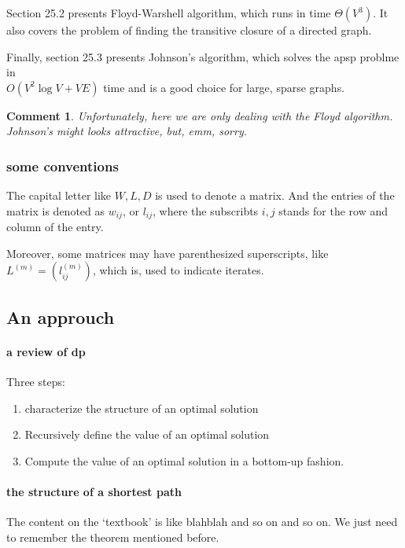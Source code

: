 \documentclass[a4paper, 10pt]{ctexart} %
\newtheorem{corollary}{Comment}
\begin{document}
Section 25.2 presents Floyd-Warshell algorithm, which
runs in time $\Theta \left( V^3\right)$. It also 
covers the problem of finding the 
transitive closure of a directed graph. 

Finally, section 25.3 presents Johnson's algorithm, which solves the 
apsp problme in \\ $O\left( V^{2} \log  V +VE\right)$ time and 
is a good choice for large, sparse graphs.
\begin{corollary}
Unfortunately, here we are only dealing with 
the Floyd algorithm. Johnson's might looks 
attractive, but, emm, sorry.
\end{corollary}
\subsubsection{some conventions}
The capital letter like $W, L , D$ is used to 
denote a matrix. And the entries of the matrix is 
denoted as  $w_{ij}$, or $l_{ij}$, where the subscribts $i, j$ stands 
for the row and column of the entry.

Moreover, some matrices may have parenthesized superscripts, 
like $L ^{ \left( m\right) } = \left( l ^{\left(m\right)} _{ij}\right)$, 
which is, used to indicate iterates.
\subsection{An approuch}
\paragraph{a review of dp} %
\label{par:a review of dp}
Three steps: 
\begin{enumerate}
    \item characterize the structure of an optimal solution
    \item Recursively define the value of an optimal solution
    \item Compute the value of an optimal solution in a bottom-up fashion.
\end{enumerate}

\paragraph{the structure of a shortest path} %
\label{par:the structure of a shortest path}
The content on the `textbook' is like blahblah and so on and so on.
We just need to remember the theorem mentioned before. 
\end{document}

